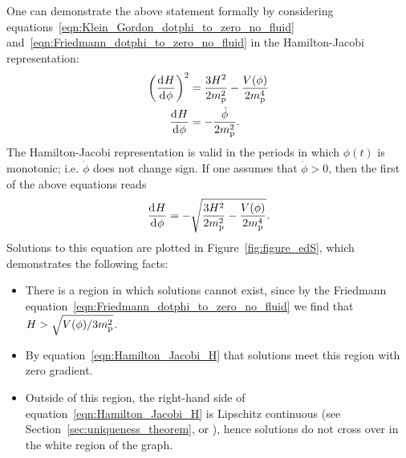 One can demonstrate the above statement formally by considering equations~\eqref{eqn:Klein_Gordon_dotphi_to_zero_no_fluid} and~\eqref{eqn:Friedmann_dotphi_to_zero_no_fluid} in the Hamilton-Jacobi representation:
%
\begin{align}
  {\left(\frac{\operatorname{d}^{}\!{H}}{\operatorname{d}^{}\!{\phi}}\right)}^2
  &=
  \frac{3H^2}{2m_{\mathrm{p}}^2} - \frac{V(\phi)}{2m_{\mathrm{p}}^4}
  \\
  \frac{\operatorname{d}^{}\!{H}}{\operatorname{d}^{}\!{\phi}}
  &=
  -\frac{\dot{\phi}}{2m_{\mathrm{p}}^2}.
\end{align}
%
The Hamilton-Jacobi representation is valid in the periods in which $\phi(t)$ is monotonic; i.e. $\dot{\phi}$ does not change sign. If one assumes that $\dot{\phi}>0$, then the first of the above equations reads
%
\begin{equation}
  \frac{\operatorname{d}^{}\!{H}}{\operatorname{d}^{}\!{\phi}} 
  = 
  -\sqrt{\frac{3H^2}{2m_{\mathrm{p}}^2} - \frac{V(\phi)}{2m_{\mathrm{p}}^4}}.
  \label{eqn:Hamilton_Jacobi_H}
\end{equation}
%
Solutions to this equation are plotted in Figure~\ref{fig:figure_edS}, which demonstrates the following facts: 
%
\begin{itemize}
  \item There is a region in which solutions cannot exist, since by the Friedmann equation~\eqref{eqn:Friedmann_dotphi_to_zero_no_fluid} we find that $H>\sqrt{V(\phi)/3m_{\mathrm{p}}^2}$.
  \item  By equation~\eqref{eqn:Hamilton_Jacobi_H} that solutions meet this region with zero gradient.
  \item Outside of this region, the right-hand side of equation~\eqref{eqn:Hamilton_Jacobi_H} is Lipschitz continuous (see Section~\ref{sec:uniqueness_theorem}, or \citet{agarwal_1993}), hence solutions do not cross over in the white region of the graph.
\end{itemize}
% 

